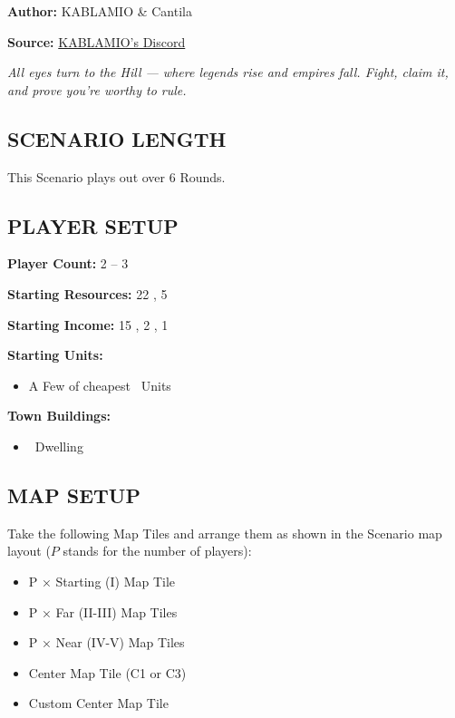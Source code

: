 
\begin{multicols}{2}

\textbf{Author:} KABLAMIO \& Cantila

\textbf{Source:} \href{https://discord.com/channels/1275490124301467799/1284428969369665631}{KABLAMIO's Discord}

\textit{All eyes turn to the Hill — where legends rise and empires fall. Fight, claim it, and prove you’re worthy to rule.}

\subsection*{\MakeUppercase{Scenario Length}}
This Scenario plays out over 6 Rounds.

\subsection*{\MakeUppercase{Player Setup}}
\textbf{Player Count:} 2 -- 3

\textbf{Starting Resources:} 22 , 5 

\textbf{Starting Income:} 15 , 2 , 1 

\textbf{Starting Units:}
\begin{itemize}
  \item A Few of cheapest \silver\ Units
\end{itemize}

\textbf{Town Buildings:}
\begin{itemize}
  \item \bronze\ Dwelling
\end{itemize}

\subsection*{\MakeUppercase{Map Setup}}
Take the following Map Tiles and arrange them as shown in the Scenario map layout ($P$ stands for the number of players):

\begin{itemize}
  \item P × Starting (I) Map Tile
  \item P × Far (II-III) Map Tiles
  \item P × Near (IV-V) Map Tiles
  \item Center Map Tile (C1 or C3)
  \item Custom Center Map Tile
\end{itemize}


\end{multicols}
